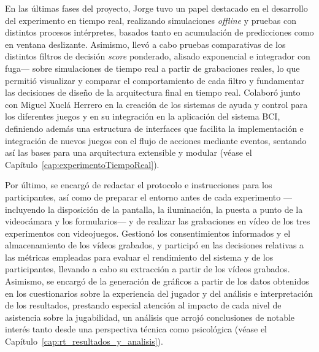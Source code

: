En las últimas fases del proyecto, Jorge tuvo un papel destacado en el desarrollo 
del experimento en tiempo real, realizando simulaciones \textit{offline} y pruebas 
con distintos procesos intérpretes, basados tanto en acumulación de predicciones 
como en ventana deslizante. Asimismo, llevó a cabo pruebas comparativas de los 
distintos filtros de decisión \textit{score} ponderado, alisado exponencial e 
integrador con fuga— sobre simulaciones de tiempo real a partir de grabaciones 
reales, lo que permitió visualizar y comparar el comportamiento de cada filtro y 
fundamentar las decisiones de diseño de la arquitectura final en tiempo real. 
Colaboró junto con Miguel Xuclá Herrero en la creación de los sistemas de ayuda 
y control para los diferentes juegos y en su integración en la aplicación del 
sistema BCI, definiendo además una estructura de interfaces que facilita la 
implementación e integración de nuevos juegos con el flujo de acciones mediante 
eventos, sentando así las bases para una arquitectura extensible y modular 
(véase el Capítulo~\ref{cap:experimentoTiempoReal}).

Por último, se encargó de redactar el protocolo e instrucciones para los 
participantes, así como de preparar el entorno antes de cada experimento 
—incluyendo la disposición de la pantalla, la iluminación, la puesta a punto de 
la videocámara y los formularios— y de realizar las grabaciones en vídeo de los 
tres experimentos con videojuegos. Gestionó los consentimientos informados y el 
almacenamiento de los vídeos grabados, y participó en las decisiones relativas 
a las métricas empleadas para evaluar el rendimiento del sistema y de los 
participantes, llevando a cabo su extracción a partir de los vídeos grabados. 
Asimismo, se encargó de la generación de gráficos a partir de los datos obtenidos 
en los cuestionarios sobre la experiencia del jugador y del análisis e 
interpretación de los resultados, prestando especial atención al impacto de cada 
nivel de asistencia sobre la jugabilidad, un análisis que arrojó conclusiones de 
notable interés tanto desde una perspectiva técnica como psicológica 
(véase el Capítulo~\ref{cap:rt_resultados_y_analisis}).

